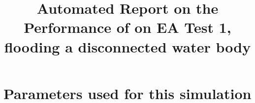 \documentclass[11pt,a4paper]{article}%
\begin{document}
 

\title{Automated Report on the Performance of \anuga{} on EA Test 1, flooding a disconnected water body}
\maketitle




\section{Parameters used for this simulation}






\end{document}
